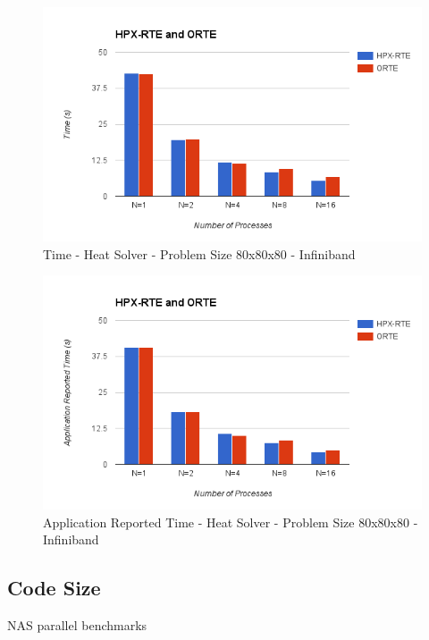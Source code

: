 \begin{figure}[h!]
\centering
\includegraphics[scale=0.7]{images/time-all-heatsolver-80-infiniband.png}
\caption[Application Reported Time - Hello World - Infiniband]{Time - Heat Solver - Problem Size 80x80x80 - Infiniband}
\label{fig:time-all-heatsolver-80-infiniband.png}
\end{figure}

\begin{figure}[h!]
\centering
\includegraphics[scale=0.7]{images/time-app-heatsolver-80-infiniband.png}
\caption[Application Reported Time - Hello World - Infiniband]{Application Reported Time - Heat Solver - Problem Size 80x80x80 - Infiniband}
\label{fig:time-app-heatsolver-80-infiniband.png}
\end{figure}


\subsection{Code Size}

NAS parallel benchmarks~\cite{bailey1991parallel}

\fi
